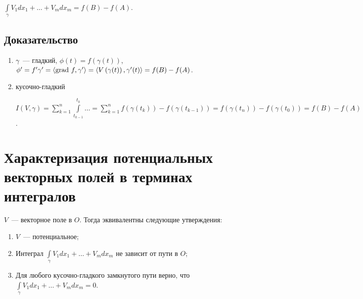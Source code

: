 \documentclass{article}
\begin{document}
        $\int\limits_{\gamma} V_1 dx_1 + \ldots + V_m dx_m = f(B) - f(A)$.
        
        \subsection{Доказательство}
        
            \begin{enumerate}
            
                \item $\gamma$~--- гладкий, $\phi(t) = f(\gamma(t))$, $\phi' = f' \gamma' = \langle \grad f, \gamma' \rangle = \langle V \left( \gamma(t) \right), \gamma'(t) \rangle = f(B) - f(A)$.
                
                \item кусочно-гладкий
                
                    $I \left( V, \gamma \right) = \sum\limits^n_{k = 1} \int\limits^{t_k}_{t_{k - 1}} \ldots = \sum\limits^n_{k = 1} f \left( \gamma (t_k) \right) - f \left( \gamma ( t_{k - 1} ) \right) = f(\gamma(t_n)) - f(\gamma(t_0)) = f(B) - f(A)$.
                    
            \end{enumerate}
            
    \newpage
    
    \section{Характеризация потенциальных векторных полей в терминах интегралов}
    
        $V$~--- векторное поле в $O$. Тогда эквивалентны следующие утверждения:
        
        \begin{enumerate}
        
            \item $V$~--- потенциальное;
            
            \item Интеграл $\int\limits_{\gamma} V_1 dx_1 + \ldots + V_m dx_m$ не зависит от пути в $O$;
            
            \item Для любого кусочно-гладкого замкнутого пути верно, что $\int\limits_{\gamma} V_1 dx_1 + \ldots + V_m dx_m = 0$.
            
        \end{enumerate}
            
\end{document}
